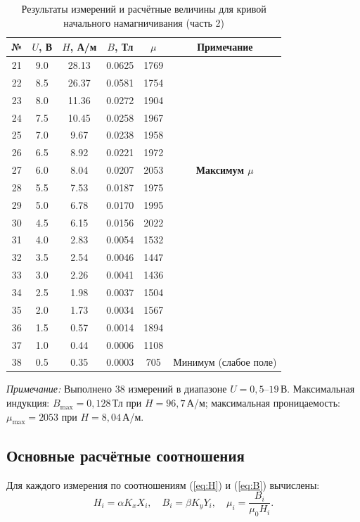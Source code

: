\documentclass[a4paper,14pt]{article}
\begin{document}
\begin{table}[H]
\centering
\caption{Результаты измерений и расчётные величины для кривой начального намагничивания (часть 2)}
\small
\begin{tabular}{|c|c|c|c|c|c|}
\hline
№ & $U$, В & $H$, А/м & $B$, Тл & $\mu$ & Примечание \\
\hline
21  &  9.0 & 28.13  & 0.0625 & 1769  & \\
22  &  8.5 & 26.37  & 0.0581 & 1754  & \\
23  &  8.0 & 11.36  & 0.0272 & 1904  & \\
24  &  7.5 & 10.45  & 0.0258 & 1967  & \\
25  &  7.0 &  9.67  & 0.0238 & 1958  & \\
26  &  6.5 &  8.92  & 0.0221 & 1972  & \\
27  &  6.0 &  8.04  & 0.0207 & 2053  & \textbf{Максимум $\mu$} \\
28  &  5.5 &  7.53  & 0.0187 & 1975  & \\
29  &  5.0 &  6.78  & 0.0170 & 1995  & \\
30  &  4.5 &  6.15  & 0.0156 & 2022  & \\
31  &  4.0 &  2.83  & 0.0054 & 1532  & \\
32  &  3.5 &  2.54  & 0.0046 & 1447  & \\
33  &  3.0 &  2.26  & 0.0041 & 1436  & \\
34  &  2.5 &  1.98  & 0.0037 & 1504  & \\
35  &  2.0 &  1.73  & 0.0034 & 1567  & \\
36  &  1.5 &  0.57  & 0.0014 & 1894  & \\
37  &  1.0 &  0.44  & 0.0006 & 1108  & \\
38  &  0.5 &  0.35  & 0.0003 &  705  & Минимум (слабое поле) \\
\hline
\end{tabular}
\end{table}

\textit{Примечание:} Выполнено 38 измерений в диапазоне $U = 0{,}5$--$19$\,В. Максимальная индукция: $B_{\text{max}} = 0{,}128$\,Тл при $H = 96{,}7$\,А/м; максимальная проницаемость: $\mu_{\text{max}} = 2053$ при $H = 8{,}04$\,А/м.

\subsection*{Основные расчётные соотношения}

Для каждого измерения по соотношениям (\ref{eq:H}) и (\ref{eq:B}) вычислены:
\[
    H_i = \alpha K_x X_i, \quad B_i = \beta K_y Y_i, \quad \mu_i = \frac{B_i}{\mu_0 H_i}.
\]
\end{document}
